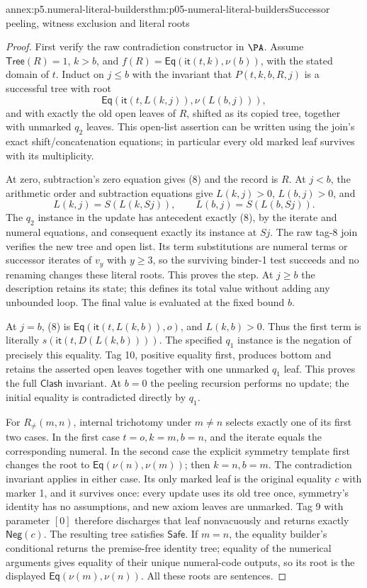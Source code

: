 \begin{annexitem}{annex:p5.numeral-literal-builders}{thm:p05-numeral-literal-builders}{Successor peeling, witness exclusion and literal roots}
\begin{proof}
First verify the raw contradiction constructor in \(\PA\). Assume
\(\mathsf{Tree}(R)=1\), \(k>b\), and
\(f(R)=\mathsf{Eq}(\mathsf{it}(t,k),\nu(b))\), with the stated domain
of \(t\).
Induct on \(j\leq b\) with the invariant that \(P(t,k,b,R,j)\) is a
successful tree with root
\[
 \mathsf{Eq}(\mathsf{it}(t,L(k,j)),\nu(L(b,j))),
\tag{8}
\]
and with exactly the old open leaves of \(R\), shifted as its copied tree,
together with unmarked \(q_2\) leaves. This open-list assertion can be
written using the join's exact shift/concatenation equations; in particular
every old marked leaf survives with its multiplicity.

At zero, subtraction's zero equation gives (8) and the record is \(R\).
At \(j<b\), the arithmetic order and subtraction equations give
\(L(k,j)>0\), \(L(b,j)>0\), and
\[
 L(k,j)=S(L(k,Sj)),\qquad L(b,j)=S(L(b,Sj)).
\]
The \(q_2\) instance in the update has antecedent exactly (8), by the
iterate and numeral equations, and consequent exactly its instance at
\(Sj\). The raw tag-8 join verifies the new tree and open list. Its
term substitutions are numeral terms or successor iterates of \(v_y\)
with \(y\geq3\), so the surviving binder-1 test succeeds and no renaming
changes these literal roots. This proves the step. At \(j\geq b\) the
description retains its state; this defines its total value without adding
any unbounded loop. The final value is evaluated at the fixed bound \(b\).

At \(j=b\), (8) is
\(\mathsf{Eq}(\mathsf{it}(t,L(k,b)),o)\), and \(L(k,b)>0\). Thus the first
term is literally \(s(\mathsf{it}(t,D(L(k,b))))\). The specified
\(q_1\) instance is the negation of precisely this equality. Tag 10,
positive equality first, produces bottom and retains the asserted open
leaves together with one unmarked \(q_1\) leaf. This proves the full
\(\mathsf{Clash}\) invariant. At \(b=0\) the peeling recursion performs
no update; the initial equality is contradicted directly by \(q_1\).

For \(R_{\ne}(m,n)\), internal trichotomy under \(m\ne n\) selects
exactly one of its first two cases. In the first case \(t=o,k=m,b=n\),
and the iterate equals the corresponding numeral. In the second case the
explicit symmetry template first changes the root to
\(\mathsf{Eq}(\nu(n),\nu(m))\); then \(k=n,b=m\). The contradiction invariant
applies in either case. Its only marked leaf is the original equality
\(c\) with marker 1, and it survives once: every update uses its old tree
once, symmetry's identity has no assumptions, and new axiom leaves are
unmarked. Tag 9 with parameter \([0]\) therefore discharges that leaf
nonvacuously and returns exactly \(\mathsf{Neg}(c)\). The resulting tree satisfies
\(\mathsf{Safe}\). If \(m=n\), the equality builder's conditional returns
the premise-free identity tree; equality of the numerical arguments gives
equality of their unique numeral-code outputs, so its root is the displayed
\(\mathsf{Eq}(\nu(m),\nu(n))\). All these roots are sentences.


\end{proof}
\end{annexitem}
